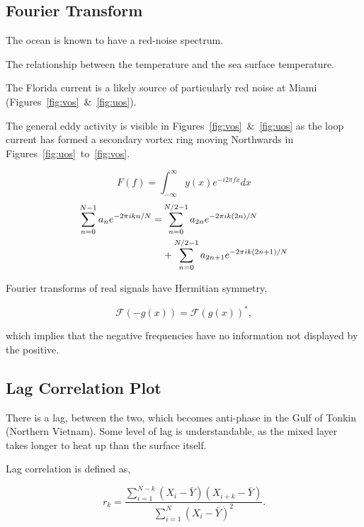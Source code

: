 \subsection{Fourier Transform}
\label{sec:fourier}


The ocean is known to have a red-noise spectrum.

The relationship between the temperature and the sea surface temperature.

The Florida current is a likely source of particularly red noise at Miami
(Figures~\ref{fig:vos}~\&~\ref{fig:uos}).


The general eddy activity is visible in Figures~\ref{fig:vos}~\&~\ref{fig:uos}
as the loop current has formed a secondary vortex ring moving Northwards
in Figures~\ref{fig:uos}~to~\ref{fig:vos}.




\begin{equation}
F(f)=\int_{-\infty}^{\infty} y(x) e^{-i 2\pi f x} d x
\end{equation}
\begin{eqnarray}
\sum_{n=0}^{N-1} a_{n} e^{-2 \pi i  k n/ N}=&\sum_{n=0}^{N / 2-1} a_{2 n}
e^{-2 \pi i k (2 n)/ N}  \\ &+\sum_{n=0}^{N / 2-1} a_{2n+1} e^{-2 \pi i k (2 n+1)/ N} \notag
\end{eqnarray}





Fourier transforms of real signals have Hermitian symmetry,

\begin{equation}
\mathcal{F}{(-g(x))}=\mathcal{F}(g(x))^{*},
\end{equation}

which implies that the negative frequencies
have no information not displayed by the positive.



\subsection{Lag Correlation Plot}
\label{sec:lag}

There is a lag, between the two, which becomes anti-phase in the Gulf
of Tonkin (Northern Vietnam).
Some level of lag is understandable,
as the mixed layer takes longer
to heat up than the surface itself.



Lag correlation is defined as,

\begin{equation}
r_{k}=
\frac{\sum_{i=1}^{N-k}\left(X_{i}-\bar{Y}\right)\left(X_{i+k}-\bar{Y}\right)}
{\sum_{i=1}^{N}\left(X_{i}-\bar{Y}\right)^{2}}.
\end{equation}

\FloatBarrier
